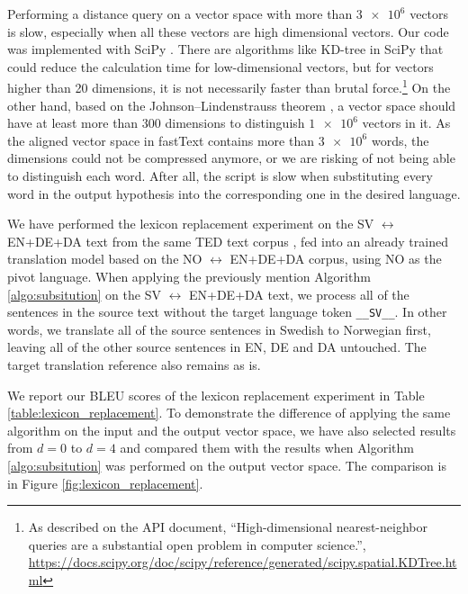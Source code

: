 \documentclass[thesis]{cluu}
\begin{document}
Performing a distance query on a vector space with more than $\num{3e6}$ vectors is slow, especially when all these vectors are high dimensional vectors. Our code was implemented with SciPy \parencite{Virtanen:2019aa}. There are algorithms like KD-tree \parencite{Maneewongvatana:aa} in SciPy that could reduce the calculation time for low-dimensional vectors, but for vectors higher than 20 dimensions, it is not necessarily faster than brutal force.\footnote{As described on the API document, ``High-dimensional nearest-neighbor queries are a substantial open problem in computer science.'', \url{https://docs.scipy.org/doc/scipy/reference/generated/scipy.spatial.KDTree.html}} On the other hand, based on the Johnson–Lindenstrauss theorem \parencite{johnson1984extensions}, a vector space should have at least more than 300 dimensions to distinguish $\num{1e6}$ vectors in it. As the aligned vector space in fastText contains more than $\num{3e6}$ words, the dimensions could not be compressed anymore, or we are risking of not being able to distinguish each word. After all, the script is slow when substituting every word in the output hypothesis into the corresponding one in the desired language.

We have performed the lexicon replacement experiment on the SV $\leftrightarrow$ EN+DE+DA text from the same TED text corpus \parencite{Qi:2018aa}, fed into an already trained translation model based on the NO $\leftrightarrow$ EN+DE+DA corpus, using NO as the pivot language. When applying the previously mention Algorithm \ref{algo:subsitution} on the SV $\leftrightarrow$ EN+DE+DA text, we process all of the sentences in the source text without the target language token \verb|__SV__|. In other words, we translate all of the source sentences in Swedish to Norwegian first, leaving all of the other source sentences in EN, DE and DA untouched. The target translation reference also remains as is. 

We report our BLEU scores of the lexicon replacement experiment in Table \ref{table:lexicon_replacement}. To demonstrate the difference of applying the same algorithm on the input and the output vector space, we have also selected results from $d=0$ to $d=4$ and compared them with the results when Algorithm \ref{algo:subsitution} was performed on the output vector space. The comparison is in Figure \ref{fig:lexicon_replacement}.
\end{document}
